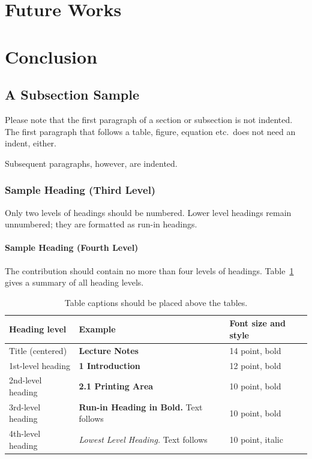\documentclass[runningheads]{llncs}
\begin{document}
\section{Future Works}
\section{Conclusion}
\subsection{A Subsection Sample}
Please note that the first paragraph of a section or subsection is
not indented. The first paragraph that follows a table, figure,
equation etc.\ does not need an indent, either.

Subsequent paragraphs, however, are indented.

\subsubsection{Sample Heading (Third Level)} Only two levels of
headings should be numbered. Lower level headings remain unnumbered;
they are formatted as run-in headings.

\paragraph{Sample Heading (Fourth Level)}
The contribution should contain no more than four levels of
headings. Table~\ref{tab1} gives a summary of all heading levels.

\begin{table}
\caption{Table captions should be placed above the
tables.}\label{tab1}
\begin{tabular}{|l|l|l|}
\hline
Heading level &  Example & Font size and style\\
\hline
Title (centered) &  {\Large\bfseries Lecture Notes} & 14 point, bold\\
1st-level heading &  {\large\bfseries 1 Introduction} & 12 point, bold\\
2nd-level heading & {\bfseries 2.1 Printing Area} & 10 point, bold\\
3rd-level heading & {\bfseries Run-in Heading in Bold.} Text follows & 10 point, bold\\
4th-level heading & {\itshape Lowest Level Heading.} Text follows & 10 point, italic\\
\hline
\end{tabular}
\end{table}
\end{document}

